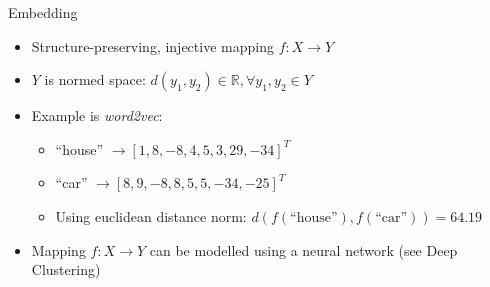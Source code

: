 \documentclass[xcolor=table,mathserif,9pt]{beamer}    %
\begin{document}
\begin{frame}{Embedding}

	\begin{itemize}
		\item Structure-preserving, injective mapping $f: X \to Y$
		\item $Y$ is normed space: $d(y_1,y_2) \in \mathbb{R}, \forall y_1,y_2 \in Y$
		\item Example is \emph{word2vec}: 
			\begin{itemize}
				\item ``house'' $\to \left[1, 8, -8, 4, 5, 3, 29, -34\right]^{T}$
				\item ``car'' $\to \left[8,9, -8, 8, 5, 5, -34, -25\right]^{T}$
				\item Using euclidean distance norm: $d(f(\text{``house''}),f(\text{``car''})) = 64.19$ 
			\end{itemize}
		\item Mapping $f: X \to Y$ can be modelled using a neural network (see Deep Clustering)
	\end{itemize}



\end{frame}
\end{document}
